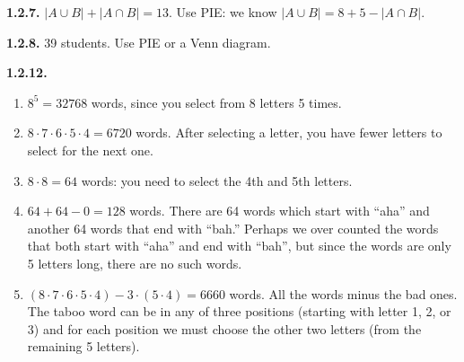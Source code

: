 \documentclass[10pt,]{book}
\theoremstyle{plain}
\theoremstyle{definition}
\theoremstyle{definition}
\theoremstyle{definition}
\theoremstyle{definition}
\numberwithin{equation}{chapter}
\newcommand{\card}[1]{\left| #1 \right|}
\begin{document}
%
\par\smallskip
\noindent\textbf{1.2.7.} \hypertarget{p-769}{}%
\(\card{A \cup B} + \card{A \cap B} = 13\).  Use PIE: we know \(\card{A \cup B} = 8 + 5 - \card{A \cap B}\).%
\par\smallskip
\noindent\textbf{1.2.8.} \hypertarget{p-771}{}%
39 students.  Use PIE or a Venn diagram.%
\par\smallskip
\noindent\textbf{1.2.12.} \hypertarget{p-782}{}%
\leavevmode%
\begin{enumerate}[label=(\alph*)]
\item\hypertarget{li-362}{}\(8^5 = 32768\) words, since you select from 8 letters 5 times.%
\item\hypertarget{li-363}{}\(8\cdot 7\cdot 6\cdot 5\cdot 4 = 6720\) words. After selecting a letter, you have fewer letters to select for the next one.%
\item\hypertarget{li-364}{}\hypertarget{p-783}{}%
\(8 \cdot 8 =64\) words: you need to select the 4th and 5th letters.%
\item\hypertarget{li-365}{}\(64 + 64 - 0 = 128\) words. There are 64 words which start with ``aha'' and another 64 words that end with ``bah.'' Perhaps we over counted the words that both start with ``aha'' and end with ``bah'', but since the words are only 5 letters long, there are no such words.%
\item\hypertarget{li-366}{}\((8\cdot 7\cdot 6\cdot 5\cdot 4) - 3\cdot (5\cdot 4) = 6660\) words. All the words minus the bad ones. The taboo word can be in any of three positions (starting with letter 1, 2, or 3) and for each position we must choose the other two letters (from the remaining 5 letters).%
\end{enumerate}
%
\par\smallskip
\end{document}
